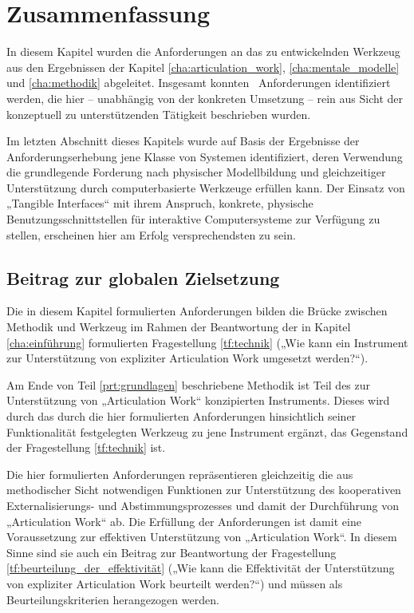 
\section{Zusammenfassung}
\label{sec:anforderungen_zusammenfassung}

In diesem Kapitel wurden die Anforderungen an das zu entwickelnden Werkzeug aus den Ergebnissen der Kapitel \ref{cha:articulation_work}, \ref{cha:mentale_modelle} und \ref{cha:methodik} abgeleitet. Insgesamt konnten \theanf \ Anforderungen identifiziert werden, die hier -- unabhängig von der konkreten Umsetzung -- rein aus Sicht der konzeptuell zu unterstützenden Tätigkeit beschrieben wurden.

Im letzten Abschnitt dieses Kapitels wurde auf Basis der Ergebnisse der Anforderungserhebung jene Klasse von Systemen identifiziert, deren Verwendung die grundlegende Forderung nach physischer Modellbildung und gleichzeitiger Unterstützung durch computerbasierte Werkzeuge erfüllen kann. Der Einsatz von „Tangible Interfaces“ mit ihrem Anspruch, konkrete, physische Benutzungsschnittstellen für interaktive Computersysteme zur Verfügung zu stellen, erscheinen hier am Erfolg versprechendsten zu sein.

\subsection{Beitrag zur globalen Zielsetzung}

Die in diesem Kapitel formulierten Anforderungen bilden die Brücke zwischen Methodik und Werkzeug im Rahmen der Beantwortung der in Kapitel \ref{cha:einführung} formulierten Fragestellung \ref{tf:technik} („Wie kann ein Instrument zur Unterstützung von expliziter Articulation Work umgesetzt werden?“).

Am Ende von Teil \ref{prt:grundlagen} beschriebene Methodik ist Teil des zur Unterstützung von „Articulation Work“ konzipierten Instruments. Dieses wird durch das durch die hier formulierten Anforderungen hinsichtlich seiner Funktionalität festgelegten Werkzeug zu jene Instrument ergänzt, das Gegenstand der Fragestellung \ref{tf:technik} ist.

Die hier formulierten Anforderungen repräsentieren gleichzeitig die aus methodischer Sicht notwendigen Funktionen zur Unterstützung des kooperativen Externalisierungs- und Abstimmungsprozesses und damit der Durchführung von „Articulation Work“ ab. Die Erfüllung der Anforderungen ist damit eine Voraussetzung zur effektiven Unterstützung von  „Articulation Work“. In diesem Sinne sind sie auch ein Beitrag zur Beantwortung der Fragestellung \ref{tf:beurteilung_der_effektivität} („Wie kann die Effektivität der Unterstützung von expliziter Articulation Work beurteilt werden?“) und müssen als Beurteilungskriterien herangezogen werden.

